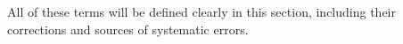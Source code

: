 All of these terms will be defined clearly in this section, including
their corrections and sources of systematic errors.


